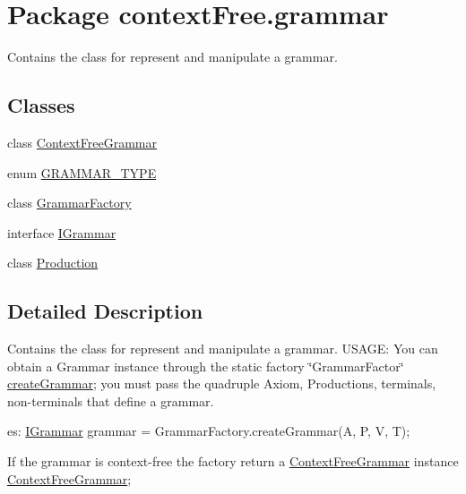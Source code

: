 \hypertarget{namespacecontext_free_1_1grammar}{\section{Package context\-Free.\-grammar}
\label{namespacecontext_free_1_1grammar}
}


Contains the class for represent and manipulate a grammar.  


\subsection*{Classes}
\begin{DoxyCompactItemize}
\item 
class \hyperlink{classcontext_free_1_1grammar_1_1_context_free_grammar}{Context\-Free\-Grammar}
\item 
enum \hyperlink{enumcontext_free_1_1grammar_1_1_g_r_a_m_m_a_r___t_y_p_e}{G\-R\-A\-M\-M\-A\-R\-\_\-\-T\-Y\-P\-E}
\item 
class \hyperlink{classcontext_free_1_1grammar_1_1_grammar_factory}{Grammar\-Factory}
\item 
interface \hyperlink{interfacecontext_free_1_1grammar_1_1_i_grammar}{I\-Grammar}
\item 
class \hyperlink{classcontext_free_1_1grammar_1_1_production}{Production}
\end{DoxyCompactItemize}


\subsection{Detailed Description}
Contains the class for represent and manipulate a grammar. U\-S\-A\-G\-E\-: You can obtain a Grammar instance through the static factory \char`\"{}\-Grammar\-Factor\char`\"{} \hyperlink{classcontext_free_1_1grammar_1_1_grammar_factory_a25d4e5bf4a9a452efca5dd6518e16c25}{create\-Grammar}; you must pass the quadruple Axiom, Productions, terminals, non-\/terminals that define a grammar.

es\-: \hyperlink{interfacecontext_free_1_1grammar_1_1_i_grammar}{I\-Grammar} grammar = Grammar\-Factory.\-create\-Grammar(\-A, P, V, T);

If the grammar is context-\/free the factory return a \hyperlink{classcontext_free_1_1grammar_1_1_context_free_grammar}{Context\-Free\-Grammar} instance \hyperlink{classcontext_free_1_1grammar_1_1_context_free_grammar}{Context\-Free\-Grammar}; 